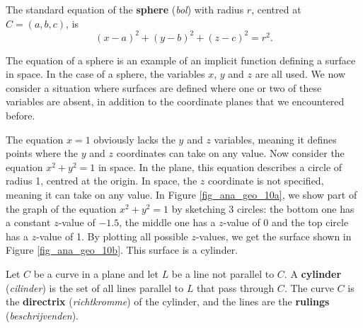 \begin{definition}\label{idea:sphere}
The standard equation of the \textbf{ sphere} (\textit{bol}) with radius $r$, centred at $C=(a,b,c)$, is
$$(x-a)^2+(y-b)^2+(z-c)^2=r^2.$$
\end{definition}

The equation of a sphere is an example of an implicit function defining a surface in space. In the case of a sphere, the variables $x$, $y$ and $z$ are all used. We now consider a situation where surfaces are defined where one or two of these variables are absent, in addition to the coordinate planes that we encountered before.


The equation $x=1$ obviously lacks the $y$ and $z$ variables, meaning it defines points where the $y$ and $z$ coordinates can take on any value. Now consider the equation $x^2+y^2=1$ in space. In the plane, this equation describes a circle of radius 1, centred at the origin. In space, the $z$ coordinate is not specified, meaning it can take on any value. In Figure \ref{fig_ana_geo_10a}, we show part of the graph of the equation $x^2+y^2=1$ by sketching 3 circles: the bottom one has a constant $z$-value of $-1.5$, the middle one has a $z$-value of 0 and the top circle has a $z$-value of 1. By plotting all possible $z$-values, we get the  surface shown in Figure \ref{fig_ana_geo_10b}. 
This surface is a cylinder.



\begin{definition}[Cylinder]\label{def:cylinder}
Let $C$ be a curve in a plane and let $L$ be a line not parallel to $C$. A \textbf{cylinder} (\textit{cilinder}) is the set of all lines parallel to $L$ that pass through $C$. The curve $C$ is the \textbf{directrix} (\textit{richtkromme}) of the cylinder, and the lines are the \textbf{rulings} (\textit{beschrijvenden}).  
\end{definition}


